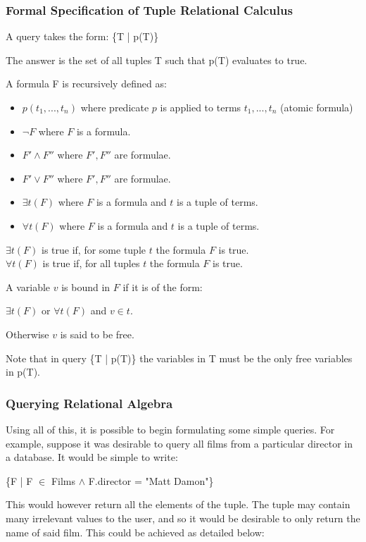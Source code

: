 \documentclass[a4paper, 11pt]{article}
\begin{document}
    \subsubsection{Formal Specification of Tuple Relational Calculus\cite{lecRA}}
      A query takes the form: \{T | p(T)\}

      The answer is the set of all tuples T such that p(T) evaluates to true.

      A formula F is recursively defined as:
      \begin{itemize}
        \item $p(t_1, ..., t_n)$ where predicate $p$ is applied to terms $t_1, ..., t_n$ (atomic formula)
        \item $\lnot F$ where $F$ is a formula.
        \item $F' \land F''$ where $F', F''$ are formulae.
        \item $F' \lor F''$ where $F', F''$ are formulae.
        \item $\exists t(F)$ where $F$ is a formula and $t$ is a tuple of terms.
        \item $\forall t(F)$ where $F$ is a formula and $t$ is a tuple of terms.
      \end{itemize}

      $\exists t(F)$ is true if, for some tuple $t$ the formula $F$ is true. \\
      $\forall t(F)$ is true if, for all tuples $t$ the formula $F$ is true.

      A variable $v$ is bound in $F$ if it is of the form:

      $\exists t(F)$ or $\forall t(F)$ and $v \in t$.

      Otherwise $v$ is said to be free.
      
      Note that in query \{T | p(T)\} the variables in T must be the only free variables in p(T).

    \subsubsection{Querying Relational Algebra}
      Using all of this, it is possible to begin formulating some simple
      queries. For example, suppose it was desirable to query all films from a
      particular director in a database. It would be simple to write:

      \{F | F $\in$ Films $\land$ F.director = "Matt Damon"\}

      This would however return all the elements of the tuple. The tuple may
      contain many irrelevant values to the user, and so it would be desirable
      to only return the name of said film. This could be achieved as detailed
      below:
\end{document}
